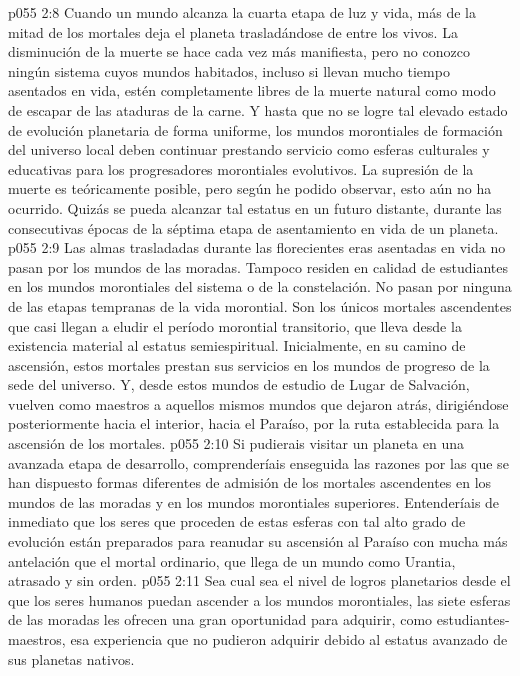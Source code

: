 \vs p055 2:8 Cuando un mundo alcanza la cuarta etapa de luz y vida, más de la mitad de los mortales deja el planeta trasladándose de entre los vivos. La disminución de la muerte se hace cada vez más manifiesta, pero no conozco ningún sistema cuyos mundos habitados, incluso si llevan mucho tiempo asentados en vida, estén completamente libres de la muerte natural como modo de escapar de las ataduras de la carne. Y hasta que no se logre tal elevado estado de evolución planetaria de forma uniforme, los mundos morontiales de formación del universo local deben continuar prestando servicio como esferas culturales y educativas para los progresadores morontiales evolutivos. La supresión de la muerte es teóricamente posible, pero según he podido observar, esto aún no ha ocurrido. Quizás se pueda alcanzar tal estatus en un futuro distante, durante las consecutivas épocas de la séptima etapa de asentamiento en vida de un planeta.
\vs p055 2:9 \pc Las almas trasladadas durante las florecientes eras asentadas en vida no pasan por los mundos de las moradas. Tampoco residen en calidad de estudiantes en los mundos morontiales del sistema o de la constelación. No pasan por ninguna de las etapas tempranas de la vida morontial. Son los únicos mortales ascendentes que casi llegan a eludir el período morontial transitorio, que lleva desde la existencia material al estatus semiespiritual. Inicialmente, en su camino de ascensión, estos mortales  prestan sus servicios en los mundos de progreso de la sede del universo. Y, desde estos mundos de estudio de Lugar de Salvación, vuelven como maestros a aquellos mismos mundos que dejaron atrás, dirigiéndose posteriormente hacia el interior, hacia el Paraíso, por la ruta establecida para la ascensión de los mortales.
\vs p055 2:10 Si pudierais visitar un planeta en una avanzada etapa de desarrollo, comprenderíais enseguida las razones por las que se han dispuesto formas diferentes de admisión de los mortales ascendentes en los mundos de las moradas y en los mundos morontiales superiores. Entenderíais de inmediato que los seres que proceden de estas esferas con tal alto grado de evolución están preparados para reanudar su ascensión al Paraíso con mucha más antelación que el mortal ordinario, que llega de un mundo como Urantia, atrasado y sin orden.
\vs p055 2:11 Sea cual sea el nivel de logros planetarios desde el que los seres humanos puedan ascender a los mundos morontiales, las siete esferas de las moradas les ofrecen una gran oportunidad para adquirir, como estudiantes\hyp{}maestros, esa experiencia que no pudieron adquirir debido al estatus avanzado de sus planetas nativos.
